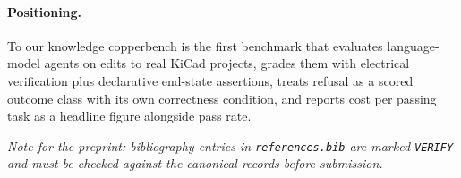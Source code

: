 \paragraph{Positioning.} To our knowledge copperbench is the first benchmark that evaluates language-model agents on edits to real KiCad projects, grades them with electrical verification plus declarative end-state assertions, treats refusal as a scored outcome class with its own correctness condition, and reports cost per passing task as a headline figure alongside pass rate.

\medskip
\noindent\textit{Note for the preprint: bibliography entries in \texttt{references.bib} are marked \texttt{VERIFY} and must be checked against the canonical records before submission.}
